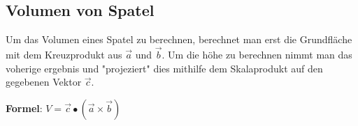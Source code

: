 \subsection{Volumen von Spatel}
Um das Volumen eines Spatel zu berechnen, berechnet man erst die Grundfläche mit dem Kreuzprodukt aus $\vec{a}$ und $\vec{b}$.
Um die höhe zu berechnen nimmt man das voherige ergebnis und "projeziert" dies mithilfe dem Skalaprodukt auf den gegebenen Vektor $\vec{c}$.

\textbf{Formel}: $V = \vec{c} \bullet (\vec{a} \times \vec{b})$


